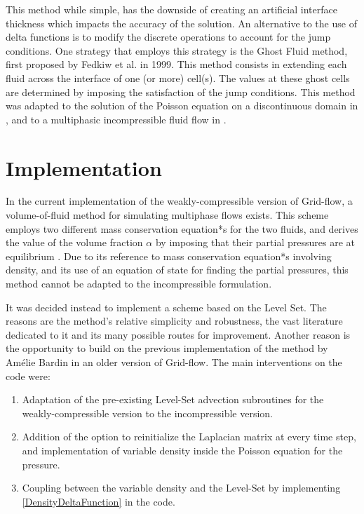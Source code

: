 \documentclass[11pt, a4paper, oneside, openany]{book}
\begin{document}
This method while simple, has the downside of creating an artificial interface thickness which impacts the accuracy of the solution.
An alternative to the use of delta functions is to modify the discrete operations to account for the jump conditions. One strategy that employs this strategy is the Ghost Fluid method, first proposed by Fedkiw et al. \cite{fedkiw1999non} in 1999. This method consists in extending each fluid across the interface of one (or more) cell(s). The values at these ghost cells are determined by imposing the satisfaction of the jump conditions. This method was adapted to the solution of the Poisson equation on a discontinuous domain in \cite{liu2000boundary}, and to a multiphasic incompressible fluid flow in \cite{kang2000boundary}. 

\chapter{Implementation}\label{Chapter_Implementation}
In the current implementation of the weakly-compressible version of Grid-flow, a volume-of-fluid method for simulating multiphase flows exists. This scheme employs two different mass conservation equation*s for the two fluids, and derives the value of the volume fraction $\alpha$ by imposing that their partial pressures are at equilibrium \cite{Li2020}. Due to its reference to mass conservation equation*s involving density, and its use of an equation of state for finding the partial pressures, this method cannot be adapted to the incompressible formulation.\par
It was decided instead to implement a scheme based on the Level Set. The reasons are the method's relative simplicity and robustness, the vast literature dedicated to it and its many possible routes for improvement. Another reason is the opportunity to build on the previous implementation of the method by Am{\'{e}}lie Bardin \cite{Bardin2015} in an older version of Grid-flow.
The main interventions on the code were:
\begin{enumerate}
	\item Adaptation of the pre-existing Level-Set advection subroutines for the weakly-compressible version to the incompressible version. 
	\item Addition of the option to reinitialize the Laplacian matrix at every time step, and implementation of variable density inside the Poisson equation for the pressure.
	\item Coupling between the variable density and the Level-Set by implementing \eqref{DensityDeltaFunction} in the code.
\end{enumerate} 
\end{document}

